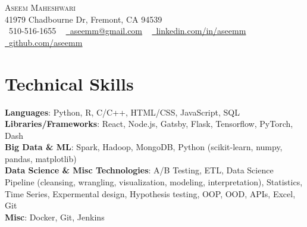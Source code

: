 \documentclass[letterpaper,11pt]{article}
\begin{document}

\begin{center}
    {\Huge \scshape Aseem Maheshwari} \\ \vspace{1pt}
    41979 Chadbourne Dr, Fremont, CA 94539 \\ \vspace{1pt}
    \small \raisebox{-0.1\height}\faPhone\ 510-516-1655 ~ \href{mailto:aseemm@gmail.com}{\raisebox{-0.2\height}\faEnvelope\  \underline{aseemm@gmail.com}} ~ 
    \href{https://linkedin.com/in/aseemm/}{\raisebox{-0.2\height}\faLinkedin\ \underline{linkedin.com/in/aseemm}}  ~
    \href{https://github.com/aseemm}{\raisebox{-0.2\height}\faGithub\ \underline{github.com/aseemm}}
    \vspace{-8pt}
\end{center}

\section{Technical Skills}
 \begin{itemize}[leftmargin=0.15in, label={}]
    \small{\item{
     \textbf{Languages}{: Python, R, C/C++, HTML/CSS, JavaScript, SQL} \\
     \textbf{Libraries/Frameworks}{: React, Node.js, Gatsby, Flask, Tensorflow, PyTorch, Dash} \\
     \textbf{Big Data \& ML}{: Spark, Hadoop, MongoDB, Python (scikit-learn, numpy, pandas, matplotlib)} \\
     \textbf{Data Science \& Misc Technologies}{: A/B Testing, ETL, Data Science Pipeline (cleansing, wrangling, visualization, modeling, interpretation), Statistics, Time Series, Expermental design, Hypothesis testing, OOP, OOD, APIs, Excel, Git} \\
     \textbf{Misc}{: Docker, Git, Jenkins} \\
    }}
 \end{itemize}
 \vspace{-16pt}
\end{document}
